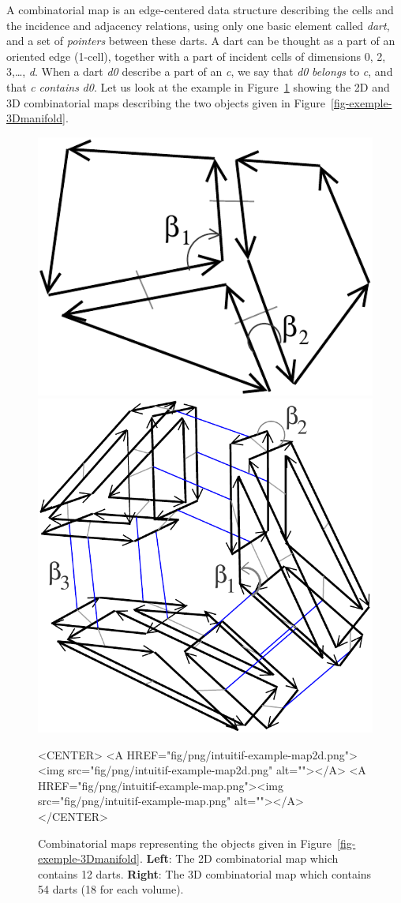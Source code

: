 A combinatorial map is an edge-centered data structure describing the
cells and the incidence and adjacency relations, using only one basic
element called \emph{dart}, and a set of \emph{pointers} between these
darts.  A dart can be thought as a part of an oriented edge (1-cell),
together with a part of incident cells of dimensions 0, 2, 3,\ldots,
\emph{d}. When a dart \emph{d0} describe a part of an  \emph{c}, we say that
\emph{d0} \emph{belongs} to \emph{c}, and that \emph{c} \emph{contains} \emph{d0}.  Let
us look at the example in Figure~\ref{fig-exemple-combi-maps} showing
the 2D and 3D combinatorial maps describing the two objects given in
Figure~\ref{fig-exemple-3Dmanifold}.
\begin{figure}[ht]
  \begin{ccTexOnly}
    \begin{center}
      \includegraphics[width=.3\textwidth]
      {Combinatorial_map/fig/pdf/intuitif-example-map2d}
      \qquad
      \includegraphics[width=.4\textwidth]
      {Combinatorial_map/fig/pdf/intuitif-example-map}
    \end{center}
  \end{ccTexOnly}
  \begin{ccHtmlOnly}
    <CENTER>
    <A HREF="fig/png/intuitif-example-map2d.png"><img src="fig/png/intuitif-example-map2d.png" alt=""></A>
    <A HREF="fig/png/intuitif-example-map.png"><img src="fig/png/intuitif-example-map.png" alt=""></A>
    </CENTER>
    \end{ccHtmlOnly}
    \caption{Combinatorial maps representing the objects given in 
      Figure~\ref{fig-exemple-3Dmanifold}.
      \textbf{Left}: The 2D combinatorial map which contains 12 darts.
      \textbf{Right}: The 3D combinatorial map which contains 54 darts
      (18 for each volume).
    }
    \label{fig-exemple-combi-maps}
\end{figure}

